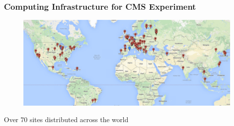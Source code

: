 \begin{frame}
\frametitle{Computing Infrastructure for CMS Experiment}

\begin{figure}[htbp]
\begin{center}
\includegraphics[width=1.0\textwidth]{images/cms-sites.jpg}
\end{center}
\end{figure}

\small{Over 70 sites distributed across the world}

\end{frame}


